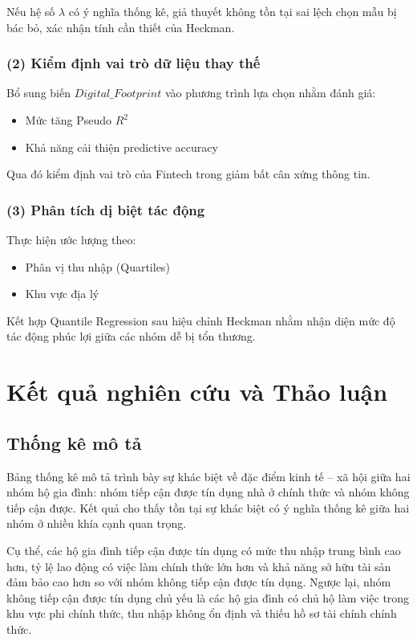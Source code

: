 \documentclass[12pt,a4paper]{report}
\begin{document}
Nếu hệ số $\lambda$ có ý nghĩa thống kê, giả thuyết không tồn tại sai lệch chọn mẫu bị bác bỏ, xác nhận tính cần thiết của Heckman.

\subsection{(2) Kiểm định vai trò dữ liệu thay thế}

Bổ sung biến $Digital\_Footprint$ vào phương trình lựa chọn nhằm đánh giá:

\begin{itemize}
	\item Mức tăng Pseudo $R^2$
	\item Khả năng cải thiện predictive accuracy
\end{itemize}

Qua đó kiểm định vai trò của Fintech trong giảm bất cân xứng thông tin.


\subsection{(3) Phân tích dị biệt tác động}

Thực hiện ước lượng theo:

\begin{itemize}
	\item Phân vị thu nhập (Quartiles)
	\item Khu vực địa lý
\end{itemize}

Kết hợp Quantile Regression sau hiệu chỉnh Heckman nhằm nhận diện mức độ tác động phúc lợi giữa các nhóm dễ bị tổn thương.

\chapter{Kết quả nghiên cứu và Thảo luận}

\section{Thống kê mô tả}

Bảng thống kê mô tả trình bày sự khác biệt về đặc điểm kinh tế – xã hội giữa hai nhóm hộ gia đình: nhóm tiếp cận được tín dụng nhà ở chính thức và nhóm không tiếp cận được. Kết quả cho thấy tồn tại sự khác biệt có ý nghĩa thống kê giữa hai nhóm ở nhiều khía cạnh quan trọng.

Cụ thể, các hộ gia đình tiếp cận được tín dụng có mức thu nhập trung bình cao hơn, tỷ lệ lao động có việc làm chính thức lớn hơn và khả năng sở hữu tài sản đảm bảo cao hơn so với nhóm không tiếp cận được tín dụng. Ngược lại, nhóm không tiếp cận được tín dụng chủ yếu là các hộ gia đình có chủ hộ làm việc trong khu vực phi chính thức, thu nhập không ổn định và thiếu hồ sơ tài chính chính thức.
\end{document}
